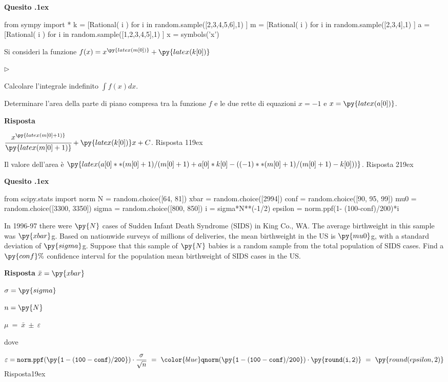 \documentclass[11pt,twoside,a4paper]{article}
\newcommand{\mylabel}[1]{#1\hfill}
\renewenvironment{itemize}
  {\begin{list}{$\triangleright$}{%
   \setlength{\parskip}{0mm}
   \setlength{\topsep}{.4\baselineskip}
   \setlength{\rightmargin}{0mm}
   \setlength{\listparindent}{0mm}
   \setlength{\itemindent}{0mm}
   \setlength{\labelwidth}{2ex}
   \setlength{\itemsep}{.4\baselineskip}
   \setlength{\parsep}{0mm}
   \setlength{\partopsep}{0mm}
   \setlength{\labelsep}{1ex}
   \setlength{\leftmargin}{\labelwidth+\labelsep}
   \let\makelabel\mylabel}}{%
   \end{list}\vspace*{-1.3mm}}
\newcounter{quesito}
\newenvironment{question}{\addtocounter{quesito}{1}\par\textbf{Quesito \thequesito.\kern1ex}}{\vspace{0.5\parskip}}
\newenvironment{answer}{\par\textbf{Risposta\quad}}{\vspace{\parskip}}
\begin{document}
\begin{question}
\begin{pycode}
from sympy import *
k = [Rational( i ) for i in random.sample([2,3,4,5,6],1) ]
m = [Rational( i ) for i in random.sample([2,3,4],1) ]
a = [Rational( i ) for i in random.sample([1,2,3,4,5],1) ]
x = symbols('x')
\end{pycode}
Si consideri la funzione $f(x) = x^{\py{latex(m[0])}} + \py{latex(k[0])}$
\begin{itemize}
\item[1.] Calcolare l'integrale indefinito $\displaystyle \int f(x) dx$.
\item[2.] Determinare l'area della parte di piano compresa tra la funzione $f$ e le due rette di equazioni $x = -1$ e $x = \py{latex(a[0])}$.
\end{itemize}
\begin{answer}

{\color{blue} $\cfrac{x^{\py{latex(m[0]+1)}}}{\py{latex(m[0]+1)}} + \py{latex(k[0])}x + C$. 
\hfill Risposta 1\kern19ex}

\smallskip
{\color{blue} Il valore dell'area è $\py{latex(a[0]**(m[0]+1)/(m[0]+1)+a[0]*k[0] - ((-1)**(m[0]+1)/(m[0]+1)-k[0]))}$.
\hfill Risposta 2\kern19ex}

\end{answer}
\end{question}



\begin{question}
\begin{pycode}
from scipy.stats import norm
N = random.choice([64, 81])
xbar = random.choice([2994])
conf = random.choice([90, 95, 99])
mu0 = random.choice([3300, 3350])
sigma = random.choice([800, 850])
i = sigma*N**(-1/2)
epsilon = norm.ppf(1- (100-conf)/200)*i
\end{pycode}
In 1996-97 there were $\py{N}$ cases of Sudden Infant Death Syndrome (SIDS) in King Co., WA. The average birthweight in this sample was $\py{xbar}$g. Based on nationwide surveys of millions of deliveries, the mean birthweight in the US is $\py{mu0}$g, with a standard deviation of $\py{sigma}$g. Suppose that this sample of $\py{N}$ babies is a random sample from the total population of SIDS cases. Find a $\py{conf}\%$ confidence interval for the population mean birthweight of SIDS cases in the US.
\begin{answer}
$\bar x = \py{xbar}$

$\sigma = \py{sigma}$

$n = \py{N}$ 

$\displaystyle\mu\ =\ \bar x\ \pm\ \varepsilon$

dove

$\varepsilon = 
{\tt norm.ppf(\py{1- (100-conf)/200})}\cdot\dfrac{\sigma}{\sqrt{n}}\ =\ {\color{blue}\tt qnorm(\py{1- (100-conf)/200})\cdot\py{round(i,2)}}\ =\ \py{round(epsilon,2)}${\color{blue}\hfill Risposta\kern19ex}


\end{answer}
\end{question}
\end{document}
